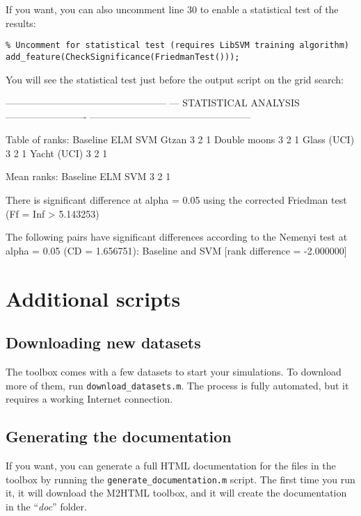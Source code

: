 If you want, you can also uncomment line 30 to enable a statistical test of the results:

\begin{lstlisting}
% Uncomment for statistical test (requires LibSVM training algorithm)
add_feature(CheckSignificance(FriedmanTest()));
\end{lstlisting}

\noindent You will see the statistical test just before the output script on the grid search:

\newpage

\begin{console}
--------------------------------------------------
--- STATISTICAL ANALYSIS -------------------------
--------------------------------------------------

Table of ranks:
              Baseline  ELM  SVM
Gtzan                3    2    1
Double moons         3    2    1
Glass (UCI)          3    2    1
Yacht (UCI)          3    2    1
 

Mean ranks:
  Baseline  ELM  SVM
         3    2    1
 
There is significant difference at alpha = 0.05 using the corrected 
   Friedman test (Ff = Inf > 5.143253)

The following pairs have significant differences according to the 
  Nemenyi test at alpha = 0.05 (CD = 1.656751):
	Baseline and SVM [rank difference = -2.000000]
\end{console}

\section{Additional scripts}

\subsection{Downloading new datasets}

The toolbox comes with a few datasets to start your simulations. To download more of them, run \verb|download_datasets.m|. The process is fully automated, but it requires a working Internet connection.

\subsection{Generating the documentation}

If you want, you can generate a full HTML documentation for the files in the toolbox by running the \verb|generate_documentation.m| script. The first time you run it, it will download the M2HTML toolbox, and it will create the documentation in the ``\textit{doc}'' folder.

